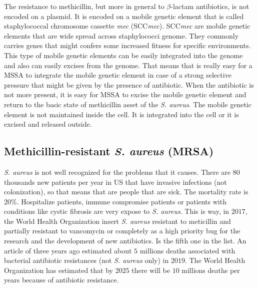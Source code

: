 The resistance to methicillin, but more in general to $\beta$-lactam antibiotics, is not encoded on a plasmid. It is encoded on a mobile genetic element that is called staphylococcal chromosome cassette \emph{mec} (SCC\emph{mec}). SCC\emph{mec} are mobile genetic elements that are wide spread across staphylococci genome. They commonly carries genes that might confers some increased fitness for specific environments. This type of mobile genetic elements can be easily integrated into the genome and also can easily excises from the genome. That means that is really easy for a MSSA to integrate the mobile genetic element in case of a strong selective pressure that might be given by the presence of antibiotic. When the antibiotic is not more present, it is easy for MSSA to excise the mobile genetic element and return to the basic state of methicillin asset of the \emph{S. aureus}. 
The mobile genetic element is not maintained inside the cell. It is integrated into the cell or it is excised and released outside.

\subsection{Methicillin-resistant \emph{S. aureus} (MRSA)}
\emph{S. aureus} is not well recognized for the problems that it causes. There are $80$ thousands new patients per year in US that have invasive infections (not colonization), so that means that are people that are sick. The mortality rate is 20$\%$. 
Hospitalize patients, immune compromise patients or patients with conditions like cystic fibrosis are very expose to \emph{S. aureus}. This is way, in $2017$, the World Health Organization insert \emph{S. aureus} resistant to meticillin and partially resistant to vancomycin or completely as a high priority bug for the research and the development of new antibiotics. Is the fifth one in the list.
An article of three years ago estimated about $5$ millions deaths associated with bacterial antibiotic resistances (not \emph{S. aureus} only) in $2019$. The World Health Organization has estimated that by $2025$ there will be $10$ millions deaths per years because of antibiotic resistance. 

